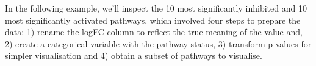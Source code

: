 \documentclass[9pt,a4paper,]{extarticle}
\newenvironment{Shaded}{\begin{snugshade}}{\end{snugshade}}
\newcommand{\AttributeTok}[1]{\textcolor[rgb]{0.13,0.29,0.53}{#1}}
\newcommand{\DecValTok}[1]{\textcolor[rgb]{0.00,0.00,0.81}{#1}}
\newcommand{\FunctionTok}[1]{\textcolor[rgb]{0.13,0.29,0.53}{\textbf{#1}}}
\newcommand{\NormalTok}[1]{#1}
\newcommand{\OtherTok}[1]{\textcolor[rgb]{0.56,0.35,0.01}{#1}}
\newcommand{\SpecialCharTok}[1]{\textcolor[rgb]{0.81,0.36,0.00}{\textbf{#1}}}
\newcommand{\StringTok}[1]{\textcolor[rgb]{0.31,0.60,0.02}{#1}}
\begin{document}
In the following example, we'll inspect the 10 most significantly inhibited and 10 most significantly activated pathways, which involved four steps to prepare the data: 1) rename the logFC column to reflect the true meaning of the value and, 2) create a categorical variable with the pathway status, 3) transform p-values for simpler visualisation and 4) obtain a subset of pathways to visualise.

\begin{Shaded}
\end{Shaded}
\end{document}
